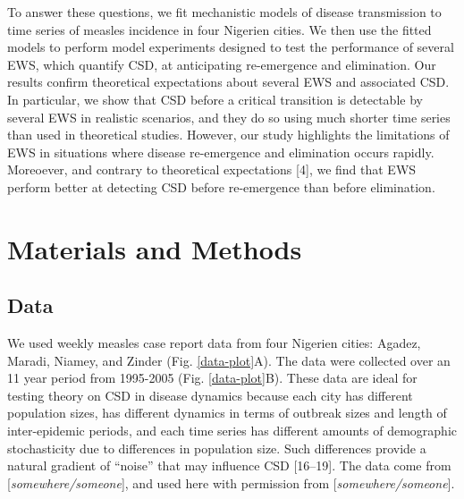 \documentclass[3p]{elsarticle} %
\begin{document}
To answer these questions, we fit mechanistic models of disease
transmission to time series of measles incidence in four Nigerien
cities. We then use the fitted models to perform model experiments
designed to test the performance of several EWS, which quantify CSD, at
anticipating re-emergence and elimination. Our results confirm
theoretical expectations about several EWS and associated CSD. In
particular, we show that CSD before a critical transition is detectable
by several EWS in realistic scenarios, and they do so using much shorter
time series than used in theoretical studies. However, our study
highlights the limitations of EWS in situations where disease
re-emergence and elimination occurs rapidly. Moreoever, and contrary to
theoretical expectations {[}4{]}, we find that EWS perform better at
detecting CSD before re-emergence than before elimination.

\hypertarget{materials-and-methods}{%
\section{Materials and Methods}\label{materials-and-methods}}

\hypertarget{data}{%
\subsection{Data}\label{data}}

We used weekly measles case report data from four Nigerien cities:
Agadez, Maradi, Niamey, and Zinder (Fig. \ref{data-plot}A). The data
were collected over an 11 year period from 1995-2005 (Fig.
\ref{data-plot}B). These data are ideal for testing theory on CSD in
disease dynamics because each city has different population sizes, has
different dynamics in terms of outbreak sizes and length of
inter-epidemic periods, and each time series has different amounts of
demographic stochasticity due to differences in population size. Such
differences provide a natural gradient of ``noise'' that may influence
CSD {[}16--19{]}. The data come from {[}\emph{somewhere/someone}{]}, and
used here with permission from {[}\emph{somewhere/someone}{]}.
\end{document}
